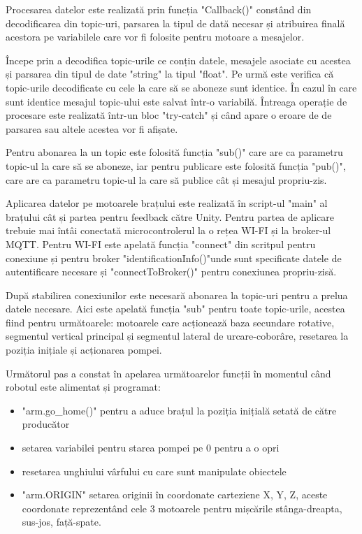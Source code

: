 Procesarea datelor este realizată prin funcția "Callback()" constând din  decodificarea din topic-uri, parsarea la tipul de dată necesar și atribuirea finală acestora pe variabilele care vor fi folosite pentru motoare a mesajelor.


Începe prin a decodifica topic-urile ce conțin datele,  mesajele asociate cu acestea și parsarea din tipul de date "string" la tipul "float". Pe urmă este verifica că topic-urile decodificate cu cele la care să se aboneze sunt identice. În cazul în care sunt identice mesajul topic-ului este salvat într-o variabilă. Întreaga operație de procesare este realizată într-un bloc "try-catch" și când apare o eroare de de parsarea sau altele acestea vor fi afișate.

Pentru abonarea la un topic este folosită funcția "sub()" care are ca parametru topic-ul la care să se aboneze, iar pentru publicare este folosită funcția "pub()", care are ca parametru topic-ul la care să publice cât și mesajul propriu-zis.

Aplicarea datelor pe motoarele brațului este realizată în script-ul "main" al brațului cât și partea pentru feedback către Unity. Pentru partea de aplicare trebuie mai întâi conectată microcontrolerul la o rețea WI-FI și la broker-ul MQTT. Pentru WI-FI este apelată funcția "connect" din scritpul pentru conexiune și pentru broker "identificationInfo()"unde sunt specificate datele de autentificare necesare și "connectToBroker()" pentru conexiunea propriu-zisă.

 După stabilirea conexiunilor este necesară abonarea la topic-uri pentru a prelua datele necesare. Aici este apelată funcția "sub" pentru toate topic-urile, acestea fiind pentru următoarele: motoarele care acționează baza secundare rotative, segmentul vertical principal și segmentul lateral de urcare-coborâre, resetarea la poziția inițiale și acționarea pompei. 
 
 Următorul pas a constat în apelarea următoarelor funcții în momentul când robotul este alimentat și programat:
 \begin{itemize}
 	\item "arm.go\_home()" pentru a aduce brațul la poziția inițială setată de către producător
 	\item setarea variabilei pentru starea pompei pe 0 pentru a o opri
 	\item resetarea unghiului vârfului cu care sunt manipulate obiectele
 	\item  "arm.ORIGIN" setarea originii  în coordonate carteziene X, Y, Z, aceste coordonate reprezentând cele 3 motoarele pentru mișcările stânga-dreapta, sus-jos, față-spate.
 \end{itemize}

